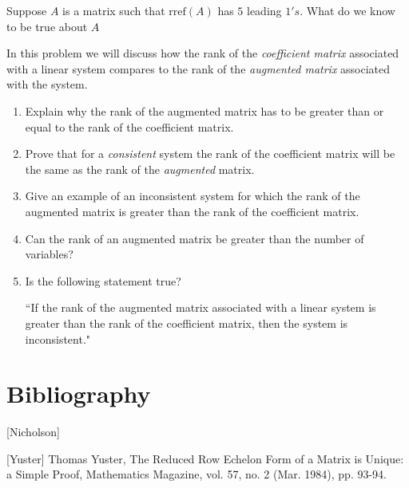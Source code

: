 \documentclass{ximera}
\begin{document}
\begin{problem}
Suppose $A$ is a matrix such that $\mbox{rref}(A)$ has $5$ leading $1's$.  What do we know to be true about $A$
\begin{selectAll}
 \end{selectAll}
\end{problem}

\begin{problem}
In this problem we will discuss how the rank of the {\it coefficient matrix} associated with a linear system compares to the rank of the {\it augmented matrix} associated with the system.  
\begin{enumerate}
\item Explain why the rank of the augmented matrix has to be greater than or equal to the rank of the coefficient matrix.
    \item Prove that for a {\it consistent} system the rank of the coefficient matrix will be the same as the rank of the {\it augmented} matrix.
    \item Give an example of an inconsistent system for which the rank of the augmented matrix is greater than the rank of the coefficient matrix.
    \item Can the rank of an augmented matrix be greater than the number of variables?
    \item Is the following statement true?
    
    ``If the rank of the augmented matrix associated with a linear system is greater than the rank of the coefficient matrix, then the system is inconsistent."
\end{enumerate}
\end{problem}



\section*{Bibliography}
[Nicholson]

[Yuster] Thomas Yuster, The Reduced Row Echelon Form of a Matrix is Unique: a
Simple Proof, Mathematics Magazine, vol. 57, no. 2 (Mar. 1984), pp. 93-94.
\end{document}

